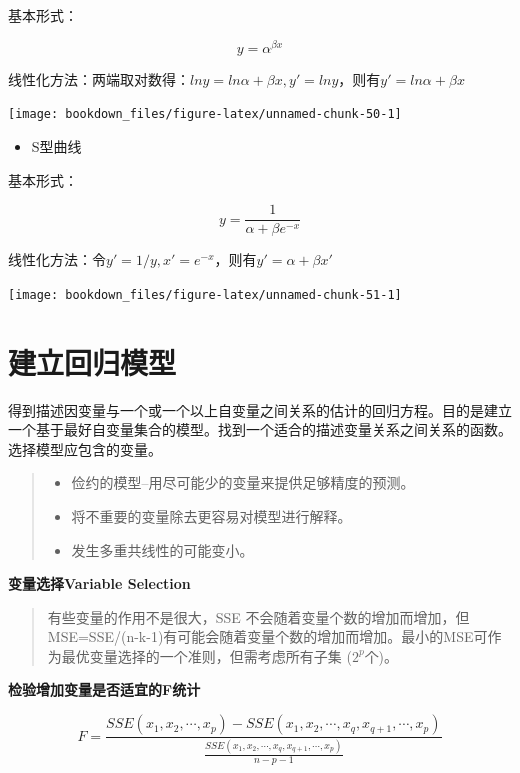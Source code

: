 \documentclass[]{ctexbook}
\providecommand{\tightlist}{%
  \setlength{\itemsep}{0pt}\setlength{\parskip}{0pt}}
\begin{document}
基本形式：

\[y=\alpha^{\beta x}\]

线性化方法：两端取对数得：\(lny=ln\alpha+\beta x,y'=lny\)，则有\(y'=ln\alpha+\beta x\)

\texttt{[image: bookdown\_files/figure-latex/unnamed-chunk-50-1]}

\begin{itemize}
\tightlist
\item
  S型曲线
\end{itemize}

基本形式：

\[y=\frac{1}{\alpha+\beta e^{-x}}\]

线性化方法：令\(y'=1/y,x'=e^{-x}\)，则有\(y'=\alpha+\beta x'\)

\texttt{[image: bookdown\_files/figure-latex/unnamed-chunk-51-1]}

\hypertarget{ux5efaux7acbux56deux5f52ux6a21ux578b}{%
\section{建立回归模型}\label{ux5efaux7acbux56deux5f52ux6a21ux578b}}

得到描述因变量与一个或一个以上自变量之间关系的估计的回归方程。目的是建立一个基于最好自变量集合的模型。找到一个适合的描述变量关系之间关系的函数。选择模型应包含的变量。

\begin{quote}
\begin{itemize}
\tightlist
\item
  俭约的模型--用尽可能少的变量来提供足够精度的预测。
\item
  将不重要的变量除去更容易对模型进行解释。
\item
  发生多重共线性的可能变小。
\end{itemize}
\end{quote}

\textbf{变量选择Variable Selection}

\begin{quote}
有些变量的作用不是很大，SSE 不会随着变量个数的增加而增加，但MSE=SSE/(n-k-1)有可能会随着变量个数的增加而增加。最小的MSE可作为最优变量选择的一个准则，但需考虑所有子集 (\(2^p\)个)。
\end{quote}

\textbf{检验增加变量是否适宜的F统计}

\[F=\frac{SSE(x_1,x_2,\cdots,x_p)-SSE(x_1,x_2,\cdots,x_q,x_{q+1},\cdots,x_p)}{\frac{SSE(x_1,x_2,\cdots,x_q,x_{q+1},\cdots,x_p)}{n-p-1}}\]
\end{document}
